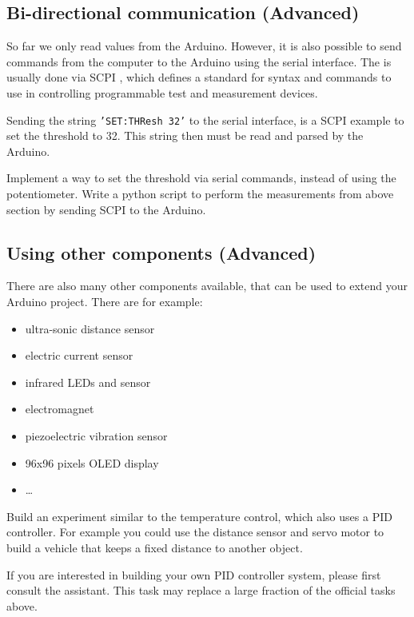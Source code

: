 \subsection{Bi-directional communication (Advanced)}\label{sec:bi}
So far we only read values from the Arduino. However, it is also possible to send commands from the computer to the Arduino using the serial interface. The is usually done via \ac{SCPI} \cite{scpi}, which defines a standard for syntax and commands to use in controlling programmable test and measurement devices.\par 
%
Sending the string \texttt{'SET:THResh 32'} to the serial interface, is a \ac{SCPI} example to set the threshold to 32. This string then must be read and parsed by the Arduino. \par
%
\begin{atask}
  Implement a way to set the threshold via serial commands, instead of using the potentiometer. Write a python script to perform the measurements from above section by sending \ac{SCPI} to the Arduino.
\end{atask}
%
\subsection{Using other components (Advanced)}
There are also many other components available, that can be used to extend your Arduino project. There are for example:
%
\begin{itemize}
  \item ultra-sonic distance sensor
  \item electric current sensor
  \item infrared LEDs and sensor
  \item electromagnet
  \item piezoelectric vibration sensor
  \item 96x96 pixels OLED display 
  \item \ldots
\end{itemize}
%
\begin{atask}
  Build an experiment similar to the temperature control, which also uses a \ac{PID} controller. For example you could use the distance sensor and servo motor to build a vehicle that keeps a fixed distance to another object.
\end{atask}
%
If you are interested in building your own \ac{PID} controller system, please first consult the assistant. This task may replace a large fraction of the official tasks above.
%
